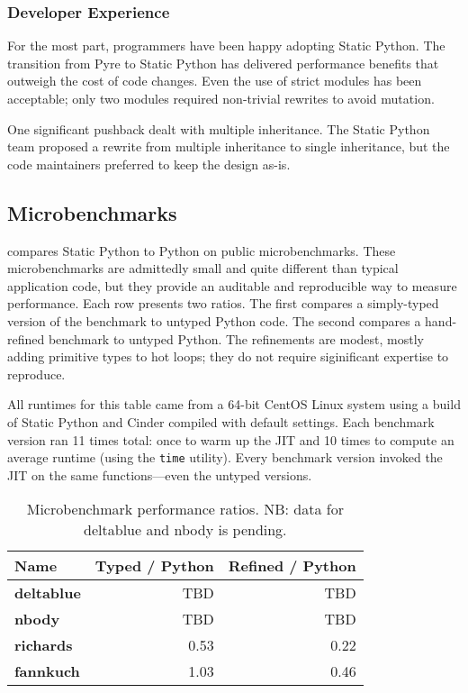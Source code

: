 \documentclass[english,cleveref,submission]{programming}
\newcommand{\SP}{Static Python}
\newcommand{\code}[1]{\texttt{#1}}
\newcommand{\bmname}[1]{\textbf{#1}}
\begin{document}
\subsubsection{Developer Experience}

For the most part, programmers have been happy adopting \SP{}.
The transition from Pyre to \SP{} has delivered performance benefits
that outweigh the cost of code changes.
Even the use of strict modules has been acceptable; only two modules
required non-trivial rewrites to avoid mutation.

One significant pushback dealt with multiple inheritance.
The \SP{} team proposed a rewrite from multiple inheritance to single inheritance,
but the code maintainers preferred to keep the design as-is.


\subsection{Microbenchmarks}

 compares \SP{} to Python on public microbenchmarks.
These microbenchmarks are admittedly small and quite different than typical application code,
but they provide an auditable and reproducible way to measure performance.
Each row presents two ratios.
The first compares a simply-typed version of the benchmark to untyped Python code.
The second compares a hand-refined benchmark to untyped Python.
The refinements are modest, mostly adding primitive types to hot loops;
they do not require siginificant expertise to reproduce.

All runtimes for this table came from a 64-bit CentOS Linux system using a build
of \SP{} and Cinder compiled with default settings.
Each benchmark version ran 11 times total: once to warm up the JIT and 10 times to
compute an average runtime (using the \code{time} utility).
Every benchmark version invoked the JIT on the same functions---even the untyped versions.

\begin{table}[t]
  \caption{Microbenchmark performance ratios. NB: data for deltablue and nbody is pending.}
  \label{t:microbenchmark}
  \begin{tabular}{lrr}
    Name               & Typed / Python & Refined / Python \\\midrule
    \bmname{deltablue} &          TBD &            TBD \\
    \bmname{nbody}     &          TBD &            TBD \\
    \bmname{richards}  &         0.53 &           0.22 \\
    \bmname{fannkuch}  &         1.03 &           0.46
  \end{tabular}
\end{table}
\end{document}
